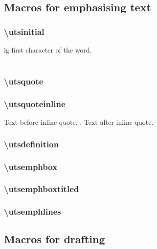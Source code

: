 \subsection{Macros for emphasising text}

\subsubsection{\textbackslash utsinitial}
ig first character of the word.
\\
\\


\subsubsection{\textbackslash utsquote}


\subsubsection{\textbackslash utsquoteinline}
Text before inline quote. . Text after inline quote.


\subsubsection{\textbackslash utsdefinition}


\subsubsection{\textbackslash utsemphbox}


\subsubsection{\textbackslash utsemphboxtitled}


\subsubsection{\textbackslash utsemphlines}




\subsection{Macros for drafting}

